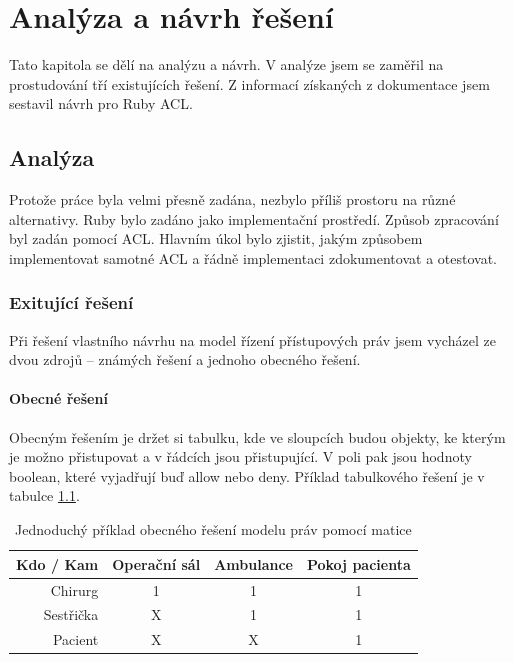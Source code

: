 \chapter{Analýza a návrh řešení}
Tato kapitola se dělí na analýzu a návrh. V analýze jsem se zaměřil na prostudování tří existujících řešení. Z informací získaných z dokumentace jsem sestavil návrh pro Ruby ACL.

\section{Analýza}

Protože práce byla velmi přesně zadána, nezbylo příliš prostoru na různé alternativy. Ruby bylo zadáno jako implementační prostředí. Způsob zpracování byl zadán pomocí ACL. Hlavním úkol bylo zjistit, jakým způsobem implementovat samotné ACL a řádně implementaci zdokumentovat a otestovat.

\subsection{Exitující řešení}
\label{sec:anal-existujicireseni}

Při řešení vlastního návrhu na model řízení přístupových práv jsem vycházel ze dvou zdrojů – známých řešení a jednoho obecného řešení.

\subsubsection{Obecné řešení}
Obecným řešením je držet si tabulku, kde ve sloupcích budou objekty, ke kterým je možno přistupovat a v řádcích jsou přistupující. V poli pak jsou hodnoty boolean, které vyjadřují buď allow nebo deny. Příklad tabulkového řešení je v tabulce \ref{tab:tab2}.
\begin{table}%
\centering
\begin{tabular}{|r||c|c|c|}
\hline
Kdo / Kam & Operační sál & Ambulance & Pokoj pacienta\\
\hline\hline
Chirurg & 1 & 1 & 1\\
\hline
Sestřička & X & 1 & 1\\
\hline
Pacient & X & X & 1\\
\hline
\end{tabular}
\caption{Jednoduchý příklad obecného řešení modelu práv pomocí matice}
\label{tab:tab2}
\end{table}


